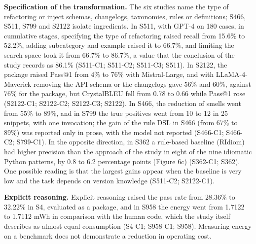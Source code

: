 \textbf{Specification of the transformation.} The six studies name the type of refactoring or inject schemas, changelogs, taxonomies, rules or definitions; S466, S511, S799 and S2122 isolate ingredients.
In S511, with GPT-4 on 180 cases, in cumulative stages, specifying the type of refactoring raised recall from 15.6\% to 52.2\%, adding subcategory and example raised it to 66.7\%, and limiting the search space took it from 66.7\% to 86.7\%, a value that the conclusion of the study records as 86.1\% (S511-C1; S511-C2; S511-C3; S511).
In S2122, the package raised Pass@1 from 4\% to 76\% with Mistral-Large, and with LLaMA-4-Maverick removing the API schema or the changelogs gave 56\% and 60\%, against 76\% for the package, but CrystalBLEU fell from 0.78 to 0.66 while Pass@1 rose (S2122-C1; S2122-C2; S2122-C3; S2122).
In S466, the reduction of smells went from 55\% to 89\%, and in S799 the true positives went from 10 to 12 in 25 snippets, with one invocation; the gain of the rule DSL in S466 (from 67\% to 89\%) was reported only in prose, with the model not reported (S466-C1; S466-C2; S799-C1).
In the opposite direction, in S362 a rule-based baseline (RIdiom) had higher precision than the approach of the study in eight of the nine idiomatic Python patterns, by 0.8 to 6.2 percentage points (Figure 6c) (S362-C1; S362).
One possible reading is that the largest gains appear when the baseline is very low and the task depends on version knowledge (S511-C2; S2122-C1).

\textbf{Explicit reasoning.}
Explicit reasoning raised the pass rate from 28.36\% to 32.22\% in S4, evaluated as a package, and in S958 the energy went from 1.7122 to 1.7112 mWh in comparison with the human code, which the study itself describes as almost equal consumption (S4-C1; S958-C1; S958).
Measuring energy on a benchmark does not demonstrate a reduction in operating cost.


